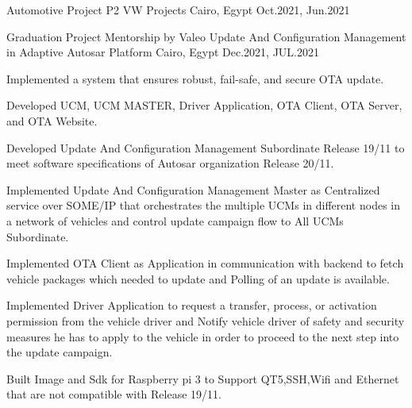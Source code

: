 \begin{cventries}
  \cventry
    {\normalsize Automotive Project} %
    {\Large P2 VW Projects} %
    {\normalsize Cairo, Egypt} %
    {\normalsize Oct.2021, Jun.2021} %
    {
      \begin{cvitems} %
        \item{}
      \end{cvitems}
    }
  \cventry
    {\normalsize Graduation Project Mentorship by \color{green}Valeo} %
    {\Large Update And Configuration Management in Adaptive Autosar Platform} %
    {\normalsize Cairo, Egypt} %
    {\normalsize Dec.2021, JUL.2021} %
    {
      \begin{cvitems} %
        \item {\normalsize Implemented a system that ensures robust, fail-safe, and secure OTA update.}
        \item {\normalsize Developed UCM, UCM MASTER, Driver Application, OTA Client, OTA Server, and OTA Website.}
        \item {\normalsize Developed Update And Configuration Management Subordinate Release 19/11 to meet software specifications of Autosar organization Release 20/11.}
        \item {\normalsize Implemented Update And Configuration Management Master as Centralized service over SOME/IP that orchestrates the multiple UCMs in different nodes in a network of vehicles and control update campaign flow to All UCMs Subordinate.}
        \item{\normalsize Implemented OTA Client as Application in communication with backend to fetch vehicle packages which needed to update and Polling of an update is available.}
        \item{\normalsize Implemented Driver Application to request a transfer, process, or activation permission from the vehicle driver and Notify vehicle driver of safety and security measures he has to apply to the vehicle in order to proceed to the next step into the update campaign.}
        \item{\normalsize Built Image and Sdk for Raspberry pi 3 to Support QT5,SSH,Wifi and Ethernet that are not compatible with Release 19/11.}
      \end{cvitems}
    }

\end{cventries}
